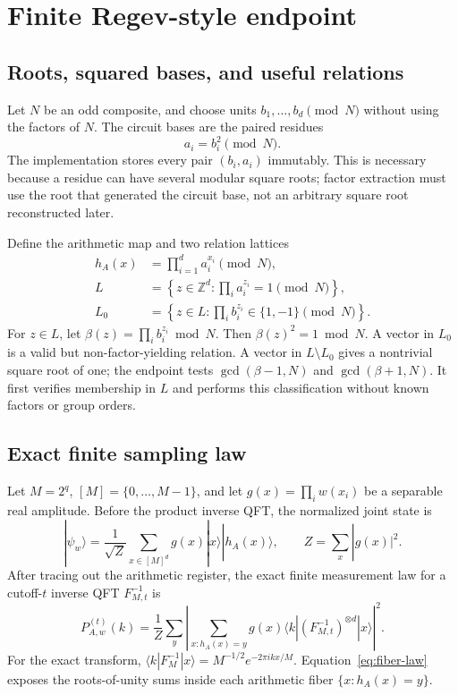 \documentclass[10pt,twocolumn]{article}
\newcommand{\Z}{\mathbb{Z}}
\newcommand{\Lz}{L_0}
\begin{document}
\section{Finite Regev-style endpoint}

\subsection{Roots, squared bases, and useful relations}

Let $N$ be an odd composite, and choose units $b_1,\ldots,b_d\pmod N$ without
using the factors of $N$.  The circuit bases are the paired residues
\begin{equation}
  a_i=b_i^2\pmod N.
\end{equation}
The implementation stores every pair $(b_i,a_i)$ immutably.  This is necessary
because a residue can have several modular square roots; factor extraction
must use the root that generated the circuit base, not an arbitrary square
root reconstructed later.

Define the arithmetic map and two relation lattices
\begin{align}
 h_A(x)&=\prod_{i=1}^{d}a_i^{x_i}\pmod N,\\
 L&=\left\{z\in\Z^d:\prod_i a_i^{z_i}=1\pmod N\right\},\\
 \Lz&=\left\{z\in L:\prod_i b_i^{z_i}\in\{1,-1\}\pmod N\right\}.
\end{align}
For $z\in L$, let $\beta(z)=\prod_i b_i^{z_i}\bmod N$.  Then
$\beta(z)^2=1\bmod N$.  A vector in $\Lz$ is a valid but non-factor-yielding
relation.  A vector in $L\setminus\Lz$ gives a nontrivial square root of one;
the endpoint tests $\gcd(\beta-1,N)$ and $\gcd(\beta+1,N)$.  It first verifies
membership in $L$ and performs this classification without known factors or
group orders.

\subsection{Exact finite sampling law}

Let $M=2^q$, $[M]=\{0,\ldots,M-1\}$, and let
$g(x)=\prod_i w(x_i)$ be a separable real amplitude.  Before the product
inverse QFT, the normalized joint state is
\begin{equation}
 |\psi_w\rangle=\frac{1}{\sqrt Z}\sum_{x\in[M]^d}
 g(x)|x\rangle|h_A(x)\rangle,
 \qquad Z=\sum_x |g(x)|^2.
\end{equation}
After tracing out the arithmetic register, the exact finite measurement law
for a cutoff-$t$ inverse QFT $F_{M,t}^{-1}$ is
\begin{equation}
 P^{(t)}_{A,w}(k)=\frac{1}{Z}\sum_y\left|
 \sum_{x:h_A(x)=y}g(x)
 \langle k|(F_{M,t}^{-1})^{\otimes d}|x\rangle
 \right|^2. \label{eq:fiber-law}
\end{equation}
For the exact transform,
$\langle k|F_M^{-1}|x\rangle=M^{-1/2}e^{-2\pi i kx/M}$.
Equation~\eqref{eq:fiber-law} exposes the roots-of-unity sums inside each
arithmetic fiber $\{x:h_A(x)=y\}$.
\end{document}
